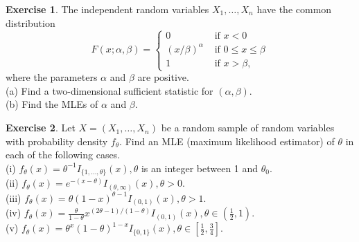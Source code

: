 \documentclass{article}
\theoremstyle{definition}
\newtheorem*{exercise*}{Exercise}
\begin{document}
	\begin{exercise*}
		The independent random variables $X_1, \ldots, X_n$ have the common distribution
		$$
		F\left(x ; \alpha, \beta\right)= \begin{cases}0 & \text { if } x<0 \\ (x / \beta)^\alpha & \text { if } 0 \leq x \leq \beta \\ 1 & \text { if } x>\beta,\end{cases}
		$$
		where the parameters $\alpha$ and $\beta$ are positive.\\
		(a) Find a two-dimensional sufficient statistic for $(\alpha, \beta)$.\\
		(b) Find the MLEs of $\alpha$ and $\beta$.
	\end{exercise*}
	
	\begin{exercise*}
		Let $X=\left(X_1, \ldots, X_n\right)$ be a random sample of random variables with probability density $f_\theta$. Find an MLE (maximum likelihood estimator) of $\theta$ in each of the following cases.\\
		(i) $f_\theta(x)=\theta^{-1} I_{\{1, \ldots, \theta\}}(x), \theta$ is an integer between 1 and $\theta_0$.\\
		(ii) $f_\theta(x)=e^{-(x-\theta)} I_{(\theta, \infty)}(x), \theta>0$.\\
		(iii) $f_\theta(x)=\theta(1-x)^{\theta-1} I_{(0,1)}(x), \theta>1$.\\
		(iv) $f_\theta(x)=\frac{\theta}{1-\theta} x^{(2 \theta-1) /(1-\theta)} I_{(0,1)}(x), \theta \in\left(\frac{1}{2}, 1\right)$.\\
		(v) $f_\theta(x)=\theta^x(1-\theta)^{1-x} I_{\{0,1\}}(x), \theta \in\left[\frac{1}{2}, \frac{3}{4}\right]$.
	\end{exercise*}
\end{document}
